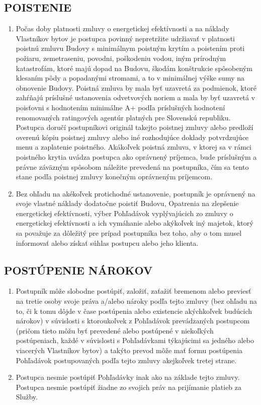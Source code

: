 \documentclass[a4paper]{article}
\begin{document}
\begin{multicols}{2}
\subsection{POISTENIE}
\begin{enumerate}
    \item Počas doby platnosti zmluvy o energetickej efektívnosti a na náklady Vlastníkov bytov je postupca povinný nepretržite udržiavať v platnosti poistnú zmluvu Budovy s minimálnym poistným krytím a poistením proti požiaru, zemetraseniu, povodni, poškodeniu vodou, iným prírodným katastrofám, ktoré majú dopad na Budovu, škodám konštrukcie spôsobeným klesaním pôdy a popadanými stromami, a to v minimálnej výške sumy na obnovenie Budovy. Poistná zmluva by mala byť uzavretá za podmienok, ktoré zahŕňajú príslušné ustanovenia odvetvových noriem a mala by byť uzavretá v poisťovni s hodnotením minimálne A+ podľa príslušných hodnotení renomovaných ratingových agentúr platných pre Slovenskú republiku. Postupca doručí postupníkovi originál takejto poistnej zmluvy alebo predloží overenú kópiu poistnej zmluvy alebo iné rozhodujúce doklady potvrdzujúce menu a zaplatenie poistného. Akákoľvek poistná zmluva, v ktorej sa v rámci poistného krytia uvádza postupca ako oprávnený príjemca, bude príslušným a právne záväzným spôsobom náležite prevedená na postupníka, čím sa tento stane podľa poistnej zmluvy konečným oprávneným príjemcom.
    \item Bez ohľadu na akékoľvek protichodné ustanovenie, postupník je oprávnený na svoje vlastné náklady dodatočne poistiť Budovu, Opatrenia na zlepšenie energetickej efektívnosti, výber  Pohľadávok vyplývajúcich zo zmluvy o energetickej efektívnosti a  ich vymáhanie  alebo akýkoľvek iný majetok, ktorý sa považuje za dôležitý pre prípad postupníka bez toho, aby o tom musel informovať alebo získať súhlas postupcu alebo jeho klienta.
\end{enumerate}
\subsection{POSTÚPENIE NÁROKOV }
\begin{enumerate}
\item	Postupník môže slobodne postúpiť, založiť, zaťažiť bremenom alebo previesť na tretie osoby svoje práva a/alebo nároky podľa tejto zmluvy (bez ohľadu na to, či k tomu dôjde v čase postúpenia alebo existencie akýchkoľvek budúcich nárokov) v súvislosti s ktoroukoľvek z Pohľadávok prevádzaných postupcom (pričom tieto môžu byť prevedené alebo postúpené v niekoľkých postúpeniach, každé v súvislosti s Pohľadávkami týkajúcimi sa jedného alebo viacerých Vlastníkov bytov) a takýto prevod môže mať formu postúpenia Pohľadávok postupovaných podľa tejto zmluvy akejkoľvek tretej strane. 
\item	Postupca nesmie postúpiť Pohľadávky inak ako na základe tejto zmluvy. Postupca nesmie postúpiť žiadne zo svojich práv na prijímanie platieb za Služby.
\end{enumerate}

\end{multicols}
\end{document}
